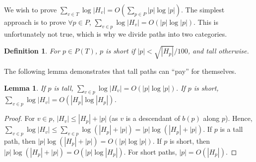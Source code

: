 \documentclass[11pt]{article}
\newcommand{\ignore}[1]{}
\newtheorem{lemma}[theorem]{Lemma}
\newtheorem{definition}[theorem]{Definition}
\theoremstyle{definition}
\newtheorem{observation}{Observation}
\newcommand{\Obs}[1]{\hyperref[obs:#1]{Observation~\ref*{obs:#1}}} %
\begin{document}
We wish to prove $\sum_{v\in T} \log |H_v| = O(\sum_{p\in P} |p| \log |p|)$. 
The simplest approach is to prove $\forall p\in P$, $\sum_{v\in p} \log |H_v|= O(|p|\log|p|)$.
This is unfortunately not true, which is why we divide paths into two categories.

\begin{definition}
 For $p\in P(T)$, $p$ is \emph{short} if $|p| < \sqrt{|H_{p}|}/100$, and \emph{tall} otherwise.
\end{definition}

\ignore{
\begin{observation}
\label{obs:decrease}
 Let $v$ be a vertex in $T$ and let $w$ be its parent.  Then $|H_w| \geq |H_v| -1$, as $L(T_v) \subseteq L(T_w)$ and the path from 
 $w$ to the root has one less vertex than the path from $v$ to the root.
 In particular, we have the following more general property.
 Let $v$ and $u$ be any two vertices in the same root to leaf path of $T$, such that $v$ is a descendant of $u$.  
 Then $|H_v| \leq |H_u| + d(u,v)$. 
\end{observation}

The following can be thought of as a generalization of the above observation, and will be useful in later sections.
}



The following lemma demonstrates that tall paths can ``pay'' for themselves.

\begin{lemma}
\label{lem:pathBounds} If $p$ is tall, $\sum_{v\in p} \log |H_v| = O(|p| \log |p|)$.
If $p$ is short, $\sum_{v\in p} \log |H_v| = O(|H_p| \log |H_p|)$.
\end{lemma}
\begin{proof} \ignore{
 By $\Obs{decrease}$ we know that for any vertex $v\in p$, $|H_v|\leq |H_{p}| + |p|$ (as $v$ is a descendant of $r_p$ along $p$).
}
For $v \in p$, $|H_v|\leq |H_{p}| + |p|$ (as $v$ is a descendant of $b(p)$ along $p$).
Hence, $\sum_{v\in p} \log |H_v| \leq \sum_{v\in p} \log(|H_{p}| + |p|)  = |p| \log (|H_{p}| + |p|)$.
 If $p$ is a tall path, then $|p| \log (|H_{p}| + |p|) = O(|p| \log |p|)$. If $p$ is short, then 
 $|p| \log (|H_{p}| + |p|) = O(|p| \log |H_{p}| )$. For short paths, $|p| = O(|H_p|)$.
\end{proof}
\end{document}
